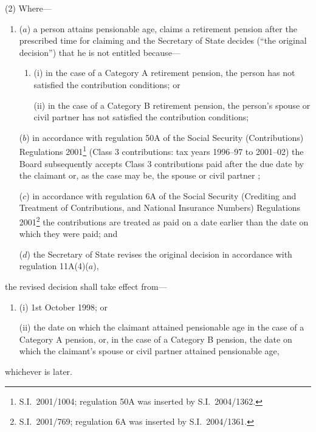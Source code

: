 \documentclass[12pt,a4paper]{article}
\begin{document}
(2) Where—
\begin{enumerate}\item[]
($a$) a person attains pensionable age, claims a retirement pension after the prescribed time for claiming and the Secretary of State decides (“the original decision”) that he is not entitled because—
\begin{enumerate}\item[]
(i) in the case of a Category A retirement pension, the person has not satisfied the contribution conditions; or

(ii) in the case of a Category B retirement pension, the person’s spouse 
or civil partner  %
has not satisfied the contribution conditions;
\end{enumerate}

($b$) in accordance with regulation 50A of the Social Security (Contributions) Regulations 2001\footnote{S.I.~2001/1004; regulation 50A was inserted by S.I.~2004/1362.} (Class 3 contributions: tax years 1996--97 to 2001--02) the Board subsequently accepts Class 3 contributions paid after the due date by the claimant or, as the case may be, the spouse
or civil partner%
;

($c$) in accordance with regulation 6A of the Social Security (Crediting and Treatment of Contributions, and National Insurance Numbers) Regulations 2001\footnote{S.I.~2001/769; regulation 6A was inserted by S.I.~2004/1361.} the contributions are treated as paid on a date earlier than the date on which they were paid; and

($d$) the Secretary of State revises the original decision in accordance with regulation 11A(4)($a$),
\end{enumerate}
the revised decision shall take effect from—
\begin{enumerate}\item[]
(i) 1st October 1998; or

(ii) the date on which the claimant attained pensionable age in the case of a Category A pension, or, in the case of a Category B pension, the date on which the claimant’s spouse or civil partner  %
attained pensionable age,
\end{enumerate}
whichever is later.

\end{document}
